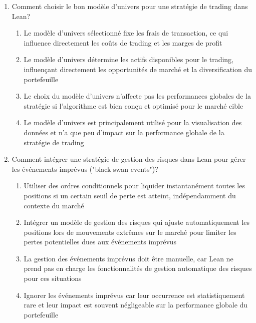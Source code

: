 \documentclass[a4paper,12pt]{article}
\begin{document}
\begin{enumerate}
    \item Comment choisir le bon modèle d'univers pour une stratégie de trading dans Lean?
    \begin{enumerate}[label=(\Alph*)]
        \item Le modèle d'univers sélectionné fixe les frais de transaction, ce qui influence directement les coûts de trading et les marges de profit
        \item Le modèle d'univers détermine les actifs disponibles pour le trading, influençant directement les opportunités de marché et la diversification du portefeuille
        \item Le choix du modèle d'univers n'affecte pas les performances globales de la stratégie si l'algorithme est bien conçu et optimisé pour le marché cible
        \item Le modèle d'univers est principalement utilisé pour la visualisation des données et n'a que peu d'impact sur la performance globale de la stratégie de trading
    \end{enumerate}

    \item Comment intégrer une stratégie de gestion des risques dans Lean pour gérer les événements imprévus ("black swan events")?
    \begin{enumerate}[label=(\Alph*)]
        \item Utiliser des ordres conditionnels pour liquider instantanément toutes les positions si un certain seuil de perte est atteint, indépendamment du contexte du marché
        \item Intégrer un modèle de gestion des risques qui ajuste automatiquement les positions lors de mouvements extrêmes sur le marché pour limiter les pertes potentielles dues aux événements imprévus
        \item La gestion des événements imprévus doit être manuelle, car Lean ne prend pas en charge les fonctionnalités de gestion automatique des risques pour ces situations
        \item Ignorer les événements imprévus car leur occurrence est statistiquement rare et leur impact est souvent négligeable sur la performance globale du portefeuille
    \end{enumerate}
\end{enumerate}
\end{document}
